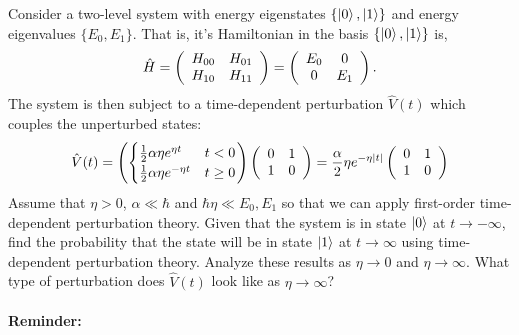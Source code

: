 \documentclass[10pt]{article}
\newcommand{\1}{\mathbf 1}
\begin{document}
Consider a two-level system with energy eigenstates $\{\ket{0},\ket{1}\}$ and energy eigenvalues $\{E_0,E_1\}$.
That is, it's Hamiltonian in the basis $\{\ket{0},\ket{1}\}$ is,
\begin{align}
	\hat H
	=
	\left(
		\begin{array}[]{cc}
			H_{00} & H_{01}\\
			H_{10} & H_{11}\\
		\end{array}
	\right)
	=
	\left(
		\begin{array}[]{cc}
			E_0 & 0\\
			0 & E_1\\
		\end{array}
	\right).
\end{align}
The system is then subject to a time-dependent perturbation $\hat V(t)$ which couples the unperturbed states:
\begin{align}
	\hat V(t)
	=
	\left(\begin{cases}
		\frac{1}{2}\alpha \eta e^{\eta t} & t <0\\
		\frac{1}{2}\alpha \eta e^{-\eta t} & t \geq 0\\
	\end{cases}
	\right)
	\left(
		\begin{array}[]{cc}
			0 & 1\\
			1 & 0\\
		\end{array}
	\right)
	=
	\frac{\alpha}{2}\eta e^{-\eta|t|}
	\left(
		\begin{array}[]{cc}
			0 & 1\\
			1 & 0\\
		\end{array}
	\right)
\end{align}
Assume that $\eta>0$, $\alpha \ll \hbar$ and $\hbar \eta \ll E_0,E_1$ so that we can apply first-order time-dependent perturbation theory.
Given that the system is in state $\ket{0}$ at $t \to -\infty$, find the probability that the state will be in state $\ket{1}$ at $t \to \infty$ using time-dependent perturbation theory.
Analyze these results as $\eta \to 0$ and $\eta \to \infty$.
What type of perturbation does $\hat V(t)$ look like as $\eta \to \infty$?

\paragraph{Reminder:}
\end{document}
